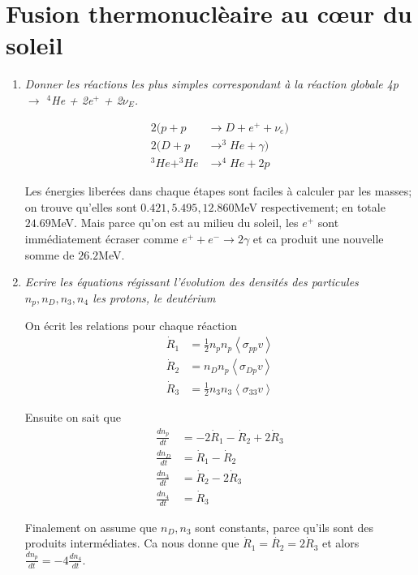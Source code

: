 \documentclass[10pt]{report}
\newcommand{\rd}[2]{\frac{d#1}{d#2}}
\newcommand{\expvalue}[1]{\left<#1\right>}
\begin{document}
\section{Fusion thermonucl\`eaire au c\oe ur du soleil}

\begin{enumerate}[1.]
    \item \emph{Donner les r\'eactions les plus simples correspondant \`a la r\'eaction globale 4p $\to$ $^4$He + 2e$^+$ + 2$\nu_E$.}

        \begin{align}
            2(p + p &\to D + e^+ + \nu_e)\\
            2(D + p &\to ^3He + \gamma)\\
            ^3He + ^3He &\to ^4He + 2p
        \end{align}

        Les \'energies liber\'ees dans chaque \'etapes sont faciles \`a calculer par les masses; on trouve qu'elles sont $0.421, 5.495, 12.860$MeV respectivement; en totale $24.69$MeV. Mais parce qu'on est au milieu du soleil, les $e^+$ sont imm\'ediatement \'ecraser comme $e^+ + e^- \to 2\gamma$ et ca produit une nouvelle somme de $26.2$MeV.

    \item \emph{Ecrire les \'equations r\'egissant l'\'evolution des densit\'es des particules $n_p, n_D, n_3, n_4$ les protons, le deut\'erium}
        
        On \'ecrit les relations pour chaque r\'eaction
        \begin{align}
            \dot{R}_1 &= \frac{1}{2}n_pn_p\expvalue{\sigma_{pp} v}\\
            \dot{R}_2 &= n_Dn_p\expvalue{\sigma_{Dp} v}\\
            \dot{R}_3 &= \frac{1}{2}n_3n_3 \expvalue{\sigma_{33} v}
        \end{align}

        Ensuite on sait que
        \begin{align}
            \rd{n_p}{t} &= -2\dot{R}_1 - \dot{R}_2 + 2\dot{R}_3\\
            \rd{n_D}{t} &= \dot{R}_1 - \dot{R}_2\\
            \rd{n_3}{t} &= \dot{R}_2 - 2\dot{R}_3\\
            \rd{n_4}{t} &= \dot{R}_3
        \end{align}
        
        Finalement on assume que $n_D, n_3$ sont constants, parce qu'ils sont des produits interm\'ediates. Ca nous donne que $\dot{R}_1 = \dot{R_2} = 2\dot{R}_3$ et alors $\rd{n_p}{t} = -4\rd{n_4}{t}$. 


\end{enumerate}
\end{document}
